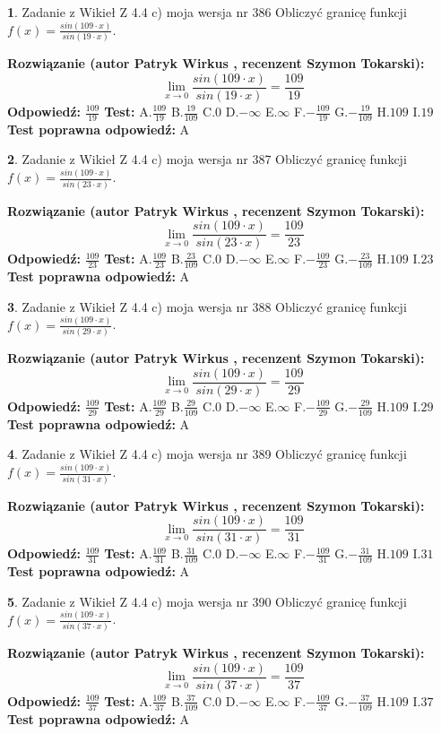\documentclass[12pt, a4paper]{article}
\theoremstyle{definition} %
\newtheorem{zad}{}
\newcommand{\zadStart}[1]{\begin{zad}#1\newline}
\newcommand{\zadStop}{\end{zad}}
\newcommand{\rozwStart}[2]{\noindent \textbf{Rozwiązanie (autor #1 , recenzent #2): }\newline}
\newcommand{\rozwStop}{\newline}
\newcommand{\odpStart}{\noindent \textbf{Odpowiedź:}\newline}
\newcommand{\odpStop}{\newline}
\newcommand{\testStart}{\noindent \textbf{Test:}\newline}
\newcommand{\testStop}{\newline}
\newcommand{\kluczStart}{\noindent \textbf{Test poprawna odpowiedź:}\newline}
\newcommand{\kluczStop}{\newline}
\begin{document}
\zadStart{Zadanie z Wikieł Z 4.4 c) moja wersja nr 386}
Obliczyć granicę funkcji $f(x)=\frac{sin(109\cdot x)}{sin(19\cdot x)}$.
\zadStop
\rozwStart{Patryk Wirkus}{Szymon Tokarski}
$$\lim\limits_{x\to 0}\frac{sin(109\cdot x)}{sin(19\cdot x)}=
\frac{109}{19}$$
\rozwStop
\odpStart
$\frac{109}{19}$
\odpStop
\testStart
A.$\frac{109}{19}$
B.$\frac{19}{109}$
C.$0$
D.$-\infty$
E.$\infty$
F.$-\frac{109}{19}$
G.$-\frac{19}{109}$
H.$109$
I.$19$
\testStop
\kluczStart
A
\kluczStop



\zadStart{Zadanie z Wikieł Z 4.4 c) moja wersja nr 387}
Obliczyć granicę funkcji $f(x)=\frac{sin(109\cdot x)}{sin(23\cdot x)}$.
\zadStop
\rozwStart{Patryk Wirkus}{Szymon Tokarski}
$$\lim\limits_{x\to 0}\frac{sin(109\cdot x)}{sin(23\cdot x)}=
\frac{109}{23}$$
\rozwStop
\odpStart
$\frac{109}{23}$
\odpStop
\testStart
A.$\frac{109}{23}$
B.$\frac{23}{109}$
C.$0$
D.$-\infty$
E.$\infty$
F.$-\frac{109}{23}$
G.$-\frac{23}{109}$
H.$109$
I.$23$
\testStop
\kluczStart
A
\kluczStop



\zadStart{Zadanie z Wikieł Z 4.4 c) moja wersja nr 388}
Obliczyć granicę funkcji $f(x)=\frac{sin(109\cdot x)}{sin(29\cdot x)}$.
\zadStop
\rozwStart{Patryk Wirkus}{Szymon Tokarski}
$$\lim\limits_{x\to 0}\frac{sin(109\cdot x)}{sin(29\cdot x)}=
\frac{109}{29}$$
\rozwStop
\odpStart
$\frac{109}{29}$
\odpStop
\testStart
A.$\frac{109}{29}$
B.$\frac{29}{109}$
C.$0$
D.$-\infty$
E.$\infty$
F.$-\frac{109}{29}$
G.$-\frac{29}{109}$
H.$109$
I.$29$
\testStop
\kluczStart
A
\kluczStop



\zadStart{Zadanie z Wikieł Z 4.4 c) moja wersja nr 389}
Obliczyć granicę funkcji $f(x)=\frac{sin(109\cdot x)}{sin(31\cdot x)}$.
\zadStop
\rozwStart{Patryk Wirkus}{Szymon Tokarski}
$$\lim\limits_{x\to 0}\frac{sin(109\cdot x)}{sin(31\cdot x)}=
\frac{109}{31}$$
\rozwStop
\odpStart
$\frac{109}{31}$
\odpStop
\testStart
A.$\frac{109}{31}$
B.$\frac{31}{109}$
C.$0$
D.$-\infty$
E.$\infty$
F.$-\frac{109}{31}$
G.$-\frac{31}{109}$
H.$109$
I.$31$
\testStop
\kluczStart
A
\kluczStop



\zadStart{Zadanie z Wikieł Z 4.4 c) moja wersja nr 390}
Obliczyć granicę funkcji $f(x)=\frac{sin(109\cdot x)}{sin(37\cdot x)}$.
\zadStop
\rozwStart{Patryk Wirkus}{Szymon Tokarski}
$$\lim\limits_{x\to 0}\frac{sin(109\cdot x)}{sin(37\cdot x)}=
\frac{109}{37}$$
\rozwStop
\odpStart
$\frac{109}{37}$
\odpStop
\testStart
A.$\frac{109}{37}$
B.$\frac{37}{109}$
C.$0$
D.$-\infty$
E.$\infty$
F.$-\frac{109}{37}$
G.$-\frac{37}{109}$
H.$109$
I.$37$
\testStop
\kluczStart
A
\kluczStop
\end{document}
